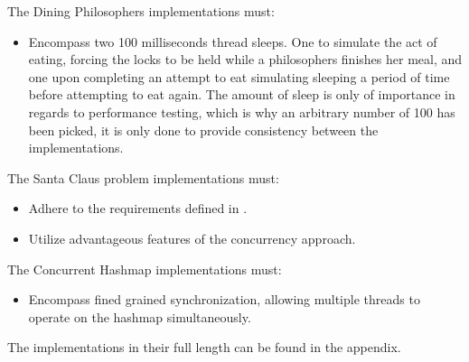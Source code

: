 The Dining Philosophers implementations must:
\begin{itemize}
	\item Encompass two 100 milliseconds thread sleeps. One to simulate the act of eating, forcing the locks to be held while a philosophers finishes her meal, and one upon completing an attempt to eat simulating sleeping a period of time before attempting to eat again. The amount of sleep is only of importance in regards to performance testing, which is why an arbitrary number of 100 has been picked, it is only done to provide consistency between the implementations.
\end{itemize}

The Santa Claus problem implementations must:
\begin{itemize}
	\item Adhere to the requirements defined in .
	\item Utilize advantageous features of the concurrency approach.
\end{itemize}

The Concurrent Hashmap implementations must:
\begin{itemize}
	\item Encompass fined grained synchronization, allowing multiple threads to operate on the hashmap simultaneously.
\end{itemize}
The implementations in their full length can be found in the appendix.
\worksheetend